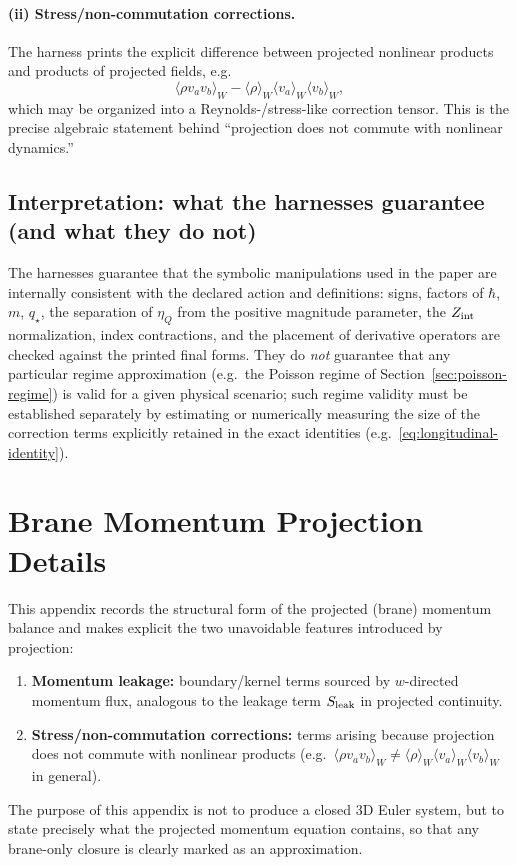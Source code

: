 \documentclass[11pt]{article}
\newcommand{\etaQ}{\eta_Q}
\newcommand{\qstar}{q_\star}
\newcommand{\Zint}{Z_{\rm int}}
\begin{document}
\paragraph{(ii) Stress/non-commutation corrections.}
The harness prints the explicit difference between projected nonlinear products and products of projected fields, e.g.
\[
\langle \rho v_a v_b\rangle_W - \langle \rho\rangle_W \langle v_a\rangle_W\langle v_b\rangle_W,
\]
which may be organized into a Reynolds-/stress-like correction tensor. This is the precise algebraic statement behind “projection does not commute with nonlinear dynamics.”

\subsection{Interpretation: what the harnesses guarantee (and what they do not)}
\label{app:wl-interpret}

The harnesses guarantee that the symbolic manipulations used in the paper are internally consistent with the declared action and definitions: signs, factors of $\hbar$, $m$, $\qstar$, the separation of $\etaQ$ from the positive magnitude parameter, the $\Zint$ normalization, index contractions, and the placement of derivative operators are checked against the printed final forms. They do \emph{not} guarantee that any particular regime approximation (e.g.\ the Poisson regime of Section~\ref{sec:poisson-regime}) is valid for a given physical scenario; such regime validity must be established separately by estimating or numerically measuring the size of the correction terms explicitly retained in the exact identities (e.g.\ \eqref{eq:longitudinal-identity}).

\section{Brane Momentum Projection Details}
\label{app:momentum}

This appendix records the structural form of the projected (brane) momentum balance and makes explicit the two unavoidable features introduced by projection:
\begin{enumerate}[leftmargin=2.2em]
\item \textbf{Momentum leakage:} boundary/kernel terms sourced by $w$-directed momentum flux, analogous to the leakage term $S_{\rm leak}$ in projected continuity.
\item \textbf{Stress/non-commutation corrections:} terms arising because projection does not commute with nonlinear products (e.g.\ $\langle \rho v_a v_b\rangle_W \neq \langle\rho\rangle_W \langle v_a\rangle_W \langle v_b\rangle_W$ in general).
\end{enumerate}
The purpose of this appendix is not to produce a closed 3D Euler system, but to state precisely what the projected momentum equation contains, so that any brane-only closure is clearly marked as an approximation.
\end{document}
